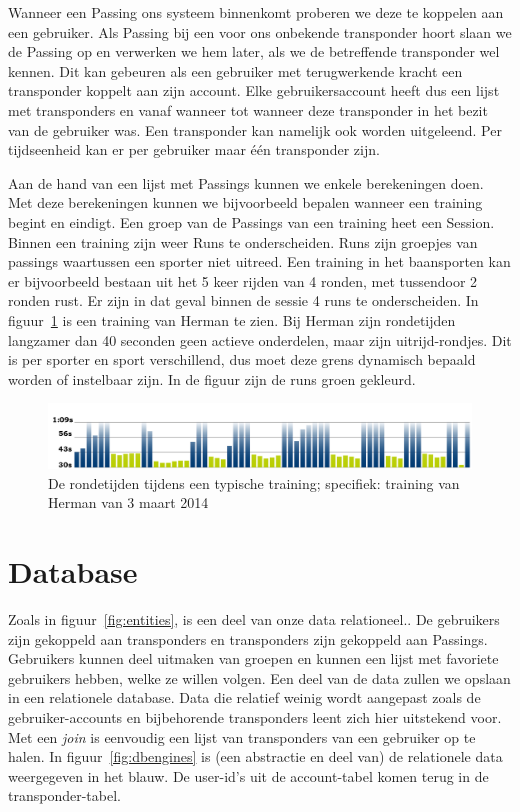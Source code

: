 Wanneer een Passing ons systeem binnenkomt proberen we deze te koppelen aan een gebruiker. Als Passing bij een voor ons onbekende transponder hoort slaan we de Passing op en verwerken we hem later, als we de betreffende transponder wel kennen. Dit kan gebeuren als een gebruiker met terugwerkende kracht een transponder koppelt aan zijn account. Elke gebruikersaccount heeft dus een lijst met transponders en vanaf wanneer tot wanneer deze transponder in het bezit van de gebruiker was. Een transponder kan namelijk ook worden uitgeleend. Per tijdseenheid kan er per gebruiker maar één transponder zijn.

Aan de hand van een lijst met Passings kunnen we enkele berekeningen doen. Met deze berekeningen kunnen we bijvoorbeeld bepalen wanneer een training begint en eindigt. Een groep van de Passings van een training heet een Session. Binnen een training zijn weer Runs te onderscheiden. Runs zijn groepjes van passings waartussen een sporter niet uitreed. Een training in het baansporten kan er bijvoorbeeld bestaan uit het 5 keer rijden van 4 ronden, met tussendoor 2 ronden rust. Er zijn in dat geval binnen de sessie 4 runs te onderscheiden. In figuur~\ref{fig:sessions} is een training van Herman te zien. Bij Herman zijn rondetijden langzamer dan 40 seconden  geen actieve onderdelen, maar zijn uitrijd-rondjes. Dit is per sporter en sport verschillend, dus moet deze grens dynamisch bepaald worden of instelbaar zijn. In de figuur zijn de runs groen gekleurd.

\begin{figure}
\centering
\includegraphics[width=1\textwidth]{style/images/MyLapsHerman}
\caption{De rondetijden tijdens een typische training; specifiek: training van Herman van 3 maart 2014}
\label{fig:sessions}
\end{figure}

\section{Database}
Zoals in figuur~\ref{fig:entities}, is een deel van onze data relationeel.. De gebruikers zijn gekoppeld aan transponders en transponders zijn gekoppeld aan Passings. Gebruikers kunnen deel uitmaken van groepen en kunnen een lijst met favoriete gebruikers hebben, welke ze willen volgen. Een deel van de data zullen we opslaan in een relationele database. Data die relatief weinig wordt aangepast zoals de gebruiker-accounts en bijbehorende transponders leent zich hier uitstekend voor. Met een \textit{join} is eenvoudig een lijst van transponders van een gebruiker op te halen. In figuur~\ref{fig:dbengines} is (een abstractie en deel van) de relationele data weergegeven in het blauw. De user-id's uit de account-tabel komen terug in de transponder-tabel.

